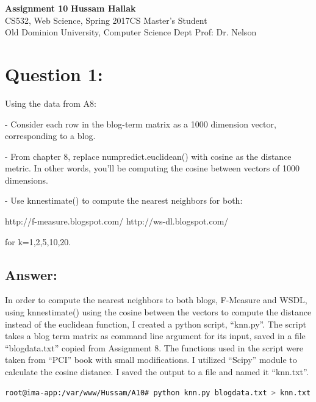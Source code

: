 \documentclass[a4paper, 11pt]{article}
\begin{document}
\noindent
\large\textbf{Assignment 10} \hfill \textbf{Hussam Hallak} \\
\normalsize CS532, Web Science, Spring 2017\hfill CS Master's Student \\
Old Dominion University, Computer Science Dept \hfill Prof: Dr. Nelson 

\section*{Question 1:}
Using the data from A8:

- Consider each row in the blog-term matrix as a 1000 dimension vector, 
corresponding to a blog.  

- From chapter 8, replace numpredict.euclidean() with cosine as the 
distance metric.  In other words, you'll be computing the cosine between
vectors of 1000 dimensions.  

- Use knnestimate() to compute the nearest neighbors for both:

http://f-measure.blogspot.com/
http://ws-dl.blogspot.com/

for k={1,2,5,10,20}.


\subsection*{Answer:}

In order to compute the nearest neighbors to both blogs, F-Measure and WSDL, using knnestimate() using the cosine between the vectors to compute the distance instead of the euclidean function, I created a python script, ``knn.py''. The script takes a blog term matrix as command line argument for its input, saved in a file ``blogdata.txt'' copied from Assignment 8. The functions used in the script were taken from ``PCI'' book with small modifications. I utilized ``Scipy'' module to calculate the cosine distance. I saved the output to a file and named it ``knn.txt''.



\begin{lstlisting}[language=bash, breakatwhitespace=〈false), label=Running knn.py, caption= Running knn.py]
root@ima-app:/var/www/Hussam/A10# python knn.py blogdata.txt > knn.txt
\end{lstlisting}


\end{document}
